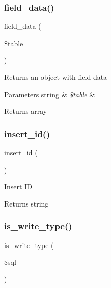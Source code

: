 \subsubsection{\texorpdfstring{field\+\_\+data()}{field\_data()}}
{\footnotesize\ttfamily field\+\_\+data (\begin{DoxyParamCaption}\item[{}]{\$table }\end{DoxyParamCaption})}

Returns an object with field data


\begin{DoxyParams}[1]{Parameters}
string & {\em \$table} & \\
\hline
\end{DoxyParams}
\begin{DoxyReturn}{Returns}
array 
\end{DoxyReturn}
\mbox{\label{class_c_i___d_b__postgre__driver_a933f2cde8dc7f87875e257d0a4902e99}} 
\subsubsection{\texorpdfstring{insert\+\_\+id()}{insert\_id()}}
{\footnotesize\ttfamily insert\+\_\+id (\begin{DoxyParamCaption}{ }\end{DoxyParamCaption})}

Insert ID

\begin{DoxyReturn}{Returns}
string 
\end{DoxyReturn}
\mbox{\label{class_c_i___d_b__postgre__driver_af435df5703c238769d6d16fde6d51182}} 
\subsubsection{\texorpdfstring{is\+\_\+write\+\_\+type()}{is\_write\_type()}}
{\footnotesize\ttfamily is\+\_\+write\+\_\+type (\begin{DoxyParamCaption}\item[{}]{\$sql }\end{DoxyParamCaption})}

